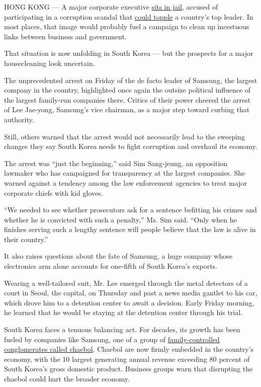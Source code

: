 HONG KONG --- A major corporate executive
\href{https://www.nytimes3xbfgragh.onion/2017/02/16/world/asia/korea-samsung-lee-jae-yong.html}{sits
in jail}, accused of participating in a corruption scandal that
\href{https://www.nytimes3xbfgragh.onion/2016/12/09/world/asia/south-korea-president-park-geun-hye-impeached.html}{could
topple} a country's top leader. In most places, that image would
probably fuel a campaign to clean up incestuous links between business
and government.

That situation is now unfolding in South Korea --- but the prospects for
a major housecleaning look uncertain.

The unprecedented arrest on Friday of the de facto leader of Samsung,
the largest company in the country, highlighted once again the outsize
political influence of the largest family-run companies there. Critics
of their power cheered the arrest of Lee Jae-yong, Samsung's vice
chairman, as a major step toward curbing that authority.

Still, others warned that the arrest would not necessarily lead to the
sweeping changes they say South Korea needs to fight corruption and
overhaul its economy.

The arrest was ``just the beginning,'' said Sim Sang-jeung, an
opposition lawmaker who has campaigned for transparency at the largest
companies. She warned against a tendency among the law enforcement
agencies to treat major corporate chiefs with kid gloves.

``We needed to see whether prosecutors ask for a sentence befitting his
crimes and whether he is convicted with such a penalty,'' Ms. Sim said.
``Only when he finishes serving such a lengthy sentence will people
believe that the law is alive in their country.''

It also raises questions about the fate of Samsung, a huge company whose
electronics arm alone accounts for one-fifth of South Korea's exports.

Wearing a well-tailored suit, Mr. Lee emerged through the metal
detectors of a court in Seoul, the capital, on Thursday and past a news
media gantlet to his car, which drove him to a detention center to await
a decision. Early Friday morning, he learned that he would be staying at
the detention center through his trial.

South Korea faces a tenuous balancing act. For decades, its growth has
been fueled by companies like Samsung, one of a group of
\href{https://www.nytimes3xbfgragh.onion/2017/02/17/business/south-korea-chaebol-samsung.html}{family-controlled
conglomerates called chaebol}. Chaebol are now firmly embedded in the
country's economy, with the 10 largest generating annual revenue
exceeding 80 percent of South Korea's gross domestic product. Business
groups warn that disrupting the chaebol could hurt the broader economy.

